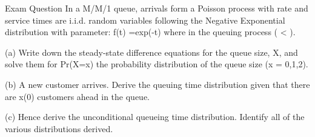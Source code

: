 Exam Question 
In a M/M/1 queue, arrivals form a Poisson process with rate  and service times are i.i.d. random variables following the Negative Exponential distribution with parameter: f(t) =exp(-t) where in the queuing process ( < ).


(a) Write down the steady-state difference equations for the queue size, X, and solve them for Pr(X=x) the probability distribution of the queue size (x = 0,1,2).

(b) A new customer arrives. Derive the queuing time distribution given that there are x(0) customers ahead in the queue.

(c) Hence derive the unconditional queueing time distribution. Identify all of the various distributions derived.




